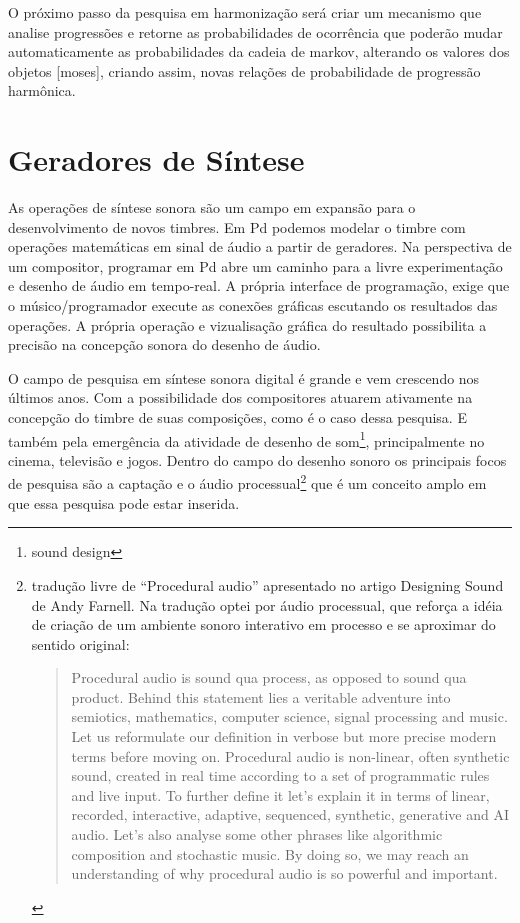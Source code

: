 \documentclass{ppgmus}
\begin{document}
O próximo passo da pesquisa em harmonização será criar um mecanismo que analise progressões
 e retorne as probabilidades de ocorrência que poderão mudar automaticamente as probabilidades
da cadeia de markov, alterando os valores dos objetos [moses], criando assim, novas relações
de probabilidade de progressão harmônica.

\pagebreak

\section{Geradores de Síntese}

As operações de síntese sonora são um campo em expansão para o
desenvolvimento de novos timbres. Em Pd podemos modelar
o timbre com operações matemáticas em sinal de
áudio a partir de geradores.
Na perspectiva de um compositor, programar em Pd abre um caminho
 para a livre experimentação e desenho
de áudio em tempo-real. A própria interface de
programação, exige que o músico/programador execute as 
conexões gráficas escutando os resultados das operações.
 A própria operação e vizualisação gráfica 
do resultado possibilita a precisão na concepção sonora do desenho
de áudio. 


O campo de pesquisa em síntese sonora digital é grande e vem crescendo
nos últimos anos. Com a possibilidade dos compositores atuarem ativamente
na concepção do timbre de suas composições, como é o caso dessa pesquisa. E
também pela emergência da atividade de desenho  de som\footnote{sound design}, 
principalmente no cinema, televisão e jogos. Dentro do campo do desenho
sonoro os principais focos de pesquisa são a captação e o áudio
processual\footnote{tradução livre de ``Procedural audio'' apresentado no artigo
 Designing Sound de Andy Farnell\cite{farnell2010designing}. Na tradução optei por
áudio processual, que reforça a idéia de criação de um ambiente sonoro interativo
em processo e se aproximar do sentido original:

\begin{quotation}
 Procedural audio is sound qua process, as opposed to sound qua product. Behind this statement lies 
a veritable adventure into semiotics, mathematics, computer science, signal processing and music. 
Let us reformulate our definition in verbose but more precise modern terms before moving on. 
Procedural audio is non-linear, often synthetic sound, created in real time according to a set 
of programmatic rules and live input. To further define it let's explain it in terms of linear, 
recorded, interactive, adaptive, sequenced, synthetic, generative and AI audio. 
Let's also analyse some other phrases like algorithmic composition and stochastic music. 
By doing so, we may reach an understanding of why procedural audio is so powerful and important.
\end{quotation} 
} que é um conceito amplo em que essa pesquisa pode estar inserida. 
\end{document}
